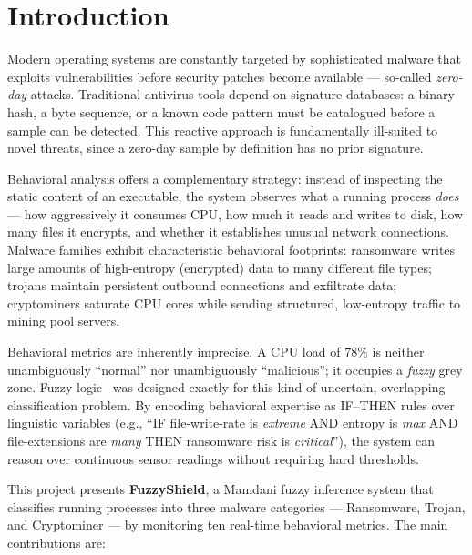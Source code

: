\documentclass[conference]{IEEEtran}
\begin{document}
\section{Introduction}

Modern operating systems are constantly targeted by sophisticated malware
that exploits vulnerabilities before security patches become available ---
so-called \textit{zero-day} attacks. Traditional antivirus tools depend
on signature databases: a binary hash, a byte sequence, or a known code
pattern must be catalogued before a sample can be detected. This reactive
approach is fundamentally ill-suited to novel threats, since a zero-day
sample by definition has no prior signature.

Behavioral analysis offers a complementary strategy: instead of inspecting
the static content of an executable, the system observes what a running
process \emph{does} --- how aggressively it consumes CPU, how much it reads
and writes to disk, how many files it encrypts, and whether it establishes
unusual network connections. Malware families exhibit characteristic
behavioral footprints: ransomware writes large amounts of high-entropy
(encrypted) data to many different file types; trojans maintain persistent
outbound connections and exfiltrate data; cryptominers saturate CPU cores
while sending structured, low-entropy traffic to mining pool servers.

Behavioral metrics are inherently imprecise. A CPU load of $78\%$ is
neither unambiguously ``normal'' nor unambiguously ``malicious''; it
occupies a \emph{fuzzy} grey zone. Fuzzy logic~\cite{zadeh1965} was
designed exactly for this kind of uncertain, overlapping classification
problem. By encoding behavioral expertise as IF--THEN rules over
linguistic variables (e.g., ``IF file-write-rate is \textit{extreme}
AND entropy is \textit{max} AND file-extensions are \textit{many} THEN
ransomware risk is \textit{critical}''), the system can reason over
continuous sensor readings without requiring hard thresholds.

This project presents \textbf{FuzzyShield}, a Mamdani fuzzy inference
system that classifies running processes into three malware categories ---
Ransomware, Trojan, and Cryptominer --- by monitoring ten real-time
behavioral metrics. The main contributions are:
\end{document}
